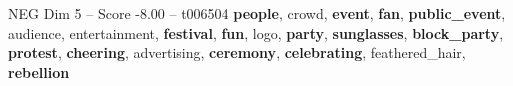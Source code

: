 \begin{textsample}{NEG Dim 5 – Score -8.00 – t006504}  \label{ex:f5_neg_008}
\textbf{people}, crowd, \textbf{event}, \textbf{fan}, \textbf{public\_event}, audience, entertainment, \textbf{festival}, \textbf{fun}, logo, \textbf{party}, \textbf{sunglasses}, \textbf{block\_party}, \textbf{protest}, \textbf{cheering}, advertising, \textbf{ceremony}, \textbf{celebrating}, feathered\_hair, \textbf{rebellion}

\end{textsample}
